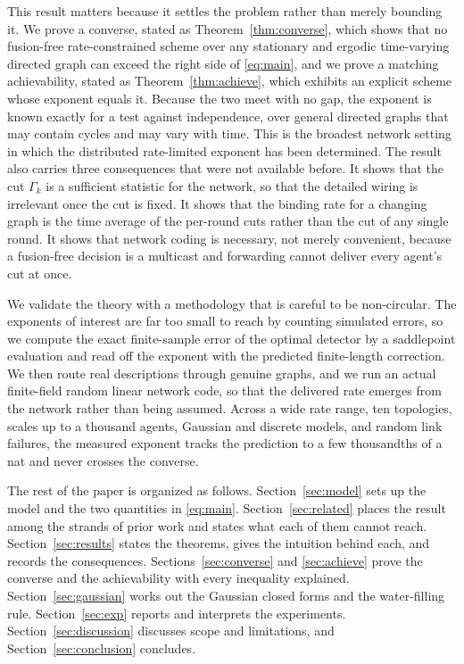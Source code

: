 \documentclass[journal]{IEEEtran}
\theoremstyle{definition}
\theoremstyle{remark}
\newcommand{\Gk}{\Gamma_k}
\begin{document}
This result matters because it settles the problem rather than merely bounding it. We prove a converse, stated as
Theorem~\ref{thm:converse}, which shows that no fusion-free rate-constrained scheme over any stationary and
ergodic time-varying directed graph can exceed the right side of \eqref{eq:main}, and we prove a matching
achievability, stated as Theorem~\ref{thm:achieve}, which exhibits an explicit scheme whose exponent equals it.
Because the two meet with no gap, the exponent is known exactly for a test against independence, over general
directed graphs that may contain cycles and may vary with time. This is the broadest network setting in which the
distributed rate-limited exponent has been determined. The result also carries three consequences that were not
available before. It shows that the cut $\Gk$ is a sufficient statistic for the network, so that the detailed
wiring is irrelevant once the cut is fixed. It shows that the binding rate for a changing graph is the time
average of the per-round cuts rather than the cut of any single round. It shows that network coding is necessary,
not merely convenient, because a fusion-free decision is a multicast and forwarding cannot deliver every agent's
cut at once.

We validate the theory with a methodology that is careful to be non-circular. The exponents of interest are far
too small to reach by counting simulated errors, so we compute the exact finite-sample error of the optimal
detector by a saddlepoint evaluation and read off the exponent with the predicted finite-length correction. We
then route real descriptions through genuine graphs, and we run an actual finite-field random linear network
code, so that the delivered rate emerges from the network rather than being assumed. Across a wide rate range,
ten topologies, scales up to a thousand agents, Gaussian and discrete models, and random link failures, the
measured exponent tracks the prediction to a few thousandths of a nat and never crosses the converse.

The rest of the paper is organized as follows. Section~\ref{sec:model} sets up the model and the two quantities
in \eqref{eq:main}. Section~\ref{sec:related} places the result among the strands of prior work and states what
each of them cannot reach. Section~\ref{sec:results} states the theorems, gives the intuition behind each, and
records the consequences. Sections~\ref{sec:converse} and \ref{sec:achieve} prove the converse and the
achievability with every inequality explained. Section~\ref{sec:gaussian} works out the Gaussian closed forms and
the water-filling rule. Section~\ref{sec:exp} reports and interprets the experiments.
Section~\ref{sec:discussion} discusses scope and limitations, and Section~\ref{sec:conclusion} concludes.
\end{document}
